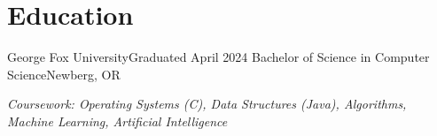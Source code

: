 \section{Education}
  \resumeSubHeadingListStart
    \resumeSubheading
        {George Fox University}{Graduated April 2024}
        {Bachelor of Science in Computer Science}{Newberg, OR}
        {\item{\small{\textit{Coursework: Operating Systems (C), Data Structures (Java), Algorithms, Machine Learning, Artificial Intelligence}}}}
  \resumeSubHeadingListEnd
